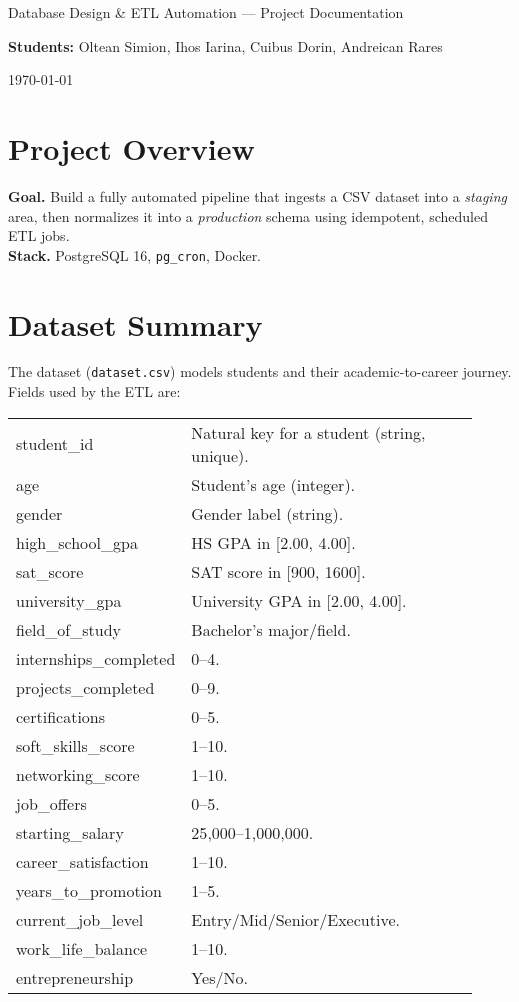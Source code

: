 \documentclass[11pt]{article}
\begin{document}
\begin{titlepage}
\centering
{\LARGE Database Design \& ETL Automation — Project Documentation\par}
\vspace{1em}
{\large \textbf{Students:} Oltean Simion, Ihos Iarina, Cuibus Dorin, Andreican Rares\quad \par}
\vfill
{\large \today\par}
\end{titlepage}


\section{Project Overview}
\textbf{Goal.} Build a fully automated pipeline that ingests a CSV dataset into a \emph{staging} area, then normalizes it into a \emph{production} schema using idempotent, scheduled ETL jobs.\\[2pt]
\textbf{Stack.} PostgreSQL 16, \texttt{pg\_cron}, Docker.\\[2pt]


\section{Dataset Summary}
The dataset (\texttt{dataset.csv}) models students and their academic-to-career journey. Fields used by the ETL are:

\begin{longtable}{>{\ttfamily}p{0.28\linewidth}p{0.64\linewidth}}
\toprule
student\_id & Natural key for a student (string, unique).\\
age & Student's age (integer).\\
gender & Gender label (string).\\
high\_school\_gpa & HS GPA in [2.00, 4.00].\\
sat\_score & SAT score in [900, 1600].\\
university\_gpa & University GPA in [2.00, 4.00].\\
field\_of\_study & Bachelor's major/field.\\
internships\_completed & 0--4.\\
projects\_completed & 0--9.\\
certifications & 0--5.\\
soft\_skills\_score & 1--10.\\
networking\_score & 1--10.\\
job\_offers & 0--5.\\
starting\_salary & 25{,}000--1{,}000{,}000.\\
career\_satisfaction & 1--10.\\
years\_to\_promotion & 1--5.\\
current\_job\_level & Entry/Mid/Senior/Executive.\\
work\_life\_balance & 1--10.\\
entrepreneurship & Yes/No.\\
\bottomrule
\end{longtable}
\end{document}
